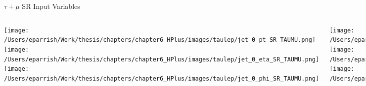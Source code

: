 \documentclass[aspectratio=169,xcolor=table]{beamer}
\begin{document}
    \begin{frame}[t]{$\tau+\mu$ SR Input Variables}
      \begin{columns}[t]
          \texttt{[image: /Users/eparrish/Work/thesis/chapters/chapter6\_HPlus/images/taulep/jet\_0\_pt\_SR\_TAUMU.png]}
          \texttt{[image: /Users/eparrish/Work/thesis/chapters/chapter6\_HPlus/images/taulep/jet\_0\_eta\_SR\_TAUMU.png]}
          \texttt{[image: /Users/eparrish/Work/thesis/chapters/chapter6\_HPlus/images/taulep/jet\_0\_phi\_SR\_TAUMU.png]}

          \texttt{[image: /Users/eparrish/Work/thesis/chapters/chapter6\_HPlus/images/taulep/lep\_0\_pt\_SR\_TAUMU.png]}
          \texttt{[image: /Users/eparrish/Work/thesis/chapters/chapter6\_HPlus/images/taulep/lep\_0\_eta\_SR\_TAUMU.png]}
          \texttt{[image: /Users/eparrish/Work/thesis/chapters/chapter6\_HPlus/images/taulep/lep\_0\_phi\_SR\_TAUMU.png]}

          \texttt{[image: /Users/eparrish/Work/thesis/chapters/chapter6\_HPlus/images/taulep/el\_0\_pt\_SR\_TAUMU.png]}
          \texttt{[image: /Users/eparrish/Work/thesis/chapters/chapter6\_HPlus/images/taulep/el\_0\_eta\_SR\_TAUMU.png]}
          \texttt{[image: /Users/eparrish/Work/thesis/chapters/chapter6\_HPlus/images/taulep/el\_0\_phi\_SR\_TAUMU.png]}

          \texttt{[image: /Users/eparrish/Work/thesis/chapters/chapter6\_HPlus/images/taulep/mu\_0\_pt\_SR\_TAUMU.png]}
          \texttt{[image: /Users/eparrish/Work/thesis/chapters/chapter6\_HPlus/images/taulep/mu\_0\_eta\_SR\_TAUMU.png]}
          \texttt{[image: /Users/eparrish/Work/thesis/chapters/chapter6\_HPlus/images/taulep/mu\_0\_phi\_SR\_TAUMU.png]}

      \end{columns}
    \end{frame}
\end{document}

